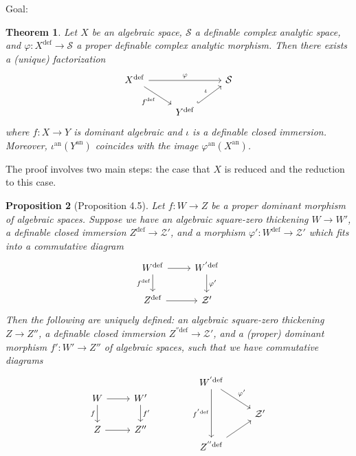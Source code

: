 \documentclass{amsart}
\newtheorem{theorem}{Theorem}[subsection]
\newtheorem{proposition}[theorem]{Proposition}
\theoremstyle{definition}
\numberwithin{equation}{section}
\newcommand{\definable}{\mathrm{def}}
\newcommand{\analytic}{\mathrm{an}}
\begin{document}
Goal:
\begin{theorem}
    Let $X$ be an algebraic space,
    $\mathcal{S}$ a definable complex analytic space,
    and $\varphi: X^{\definable} \to \mathcal{S}$ a proper definable complex analytic morphism.
    Then there exists a (unique) factorization
    \[\begin{tikzcd}
        X^{\definable}\ar[dr,"f^{\definable}"']\ar[rr,"\varphi"] & & \mathcal{S} \\
        & Y^{\definable} \ar[ur,"\iota",hook] & 
    \end{tikzcd}\]
    where $f: X \to Y$ is dominant algebraic and $\iota$ is a definable closed immersion.
    Moreover, $\iota^{\analytic}(Y^{\analytic})$ coincides with the image $\varphi^{\analytic}(X^{\analytic})$.
\end{theorem}

The proof involves two main steps:
the case that $X$ is reduced and the reduction to this case.

\begin{proposition}[Proposition 4.5]
    Let $f: W \to Z$ be a proper dominant morphism of algebraic spaces.
    Suppose we have an algebraic square-zero thickening
    $W \to W'$, a definable closed immersion $Z^{\definable} \to \mathcal{Z}'$,
    and a morphism $\varphi': W^{\definable}\to \mathcal{Z}'$ which fits into a commutative diagram
    \[\begin{tikzcd}
        W^{\definable} \ar[r]\ar[d,"f^{\definable}"'] & W^{'\definable}\ar[d,"\varphi'"] \\
        Z^{\definable} \ar[r] & \mathcal{Z}'
    \end{tikzcd}\]
    Then the following are uniquely defined:
    an algebraic square-zero thickening
    $Z \to Z''$,
    a definable closed immersion $Z^{''\definable} \to \mathcal{Z}'$,
    and a (proper) dominant morphism $f': W' \to Z''$ of algebraic spaces,
    such that we have commutative diagrams
    \[
    \begin{tikzcd}
        W\ar[r]\ar[d,"f"'] & W'\ar[d,"f'"] \\
        Z \ar[r] & Z''
    \end{tikzcd}
    \hspace{40pt}
    \begin{tikzcd}
        W^{'\definable}\ar[dd,"f^{'\definable}"']\ar[rd,"\varphi'"] & \\
        & \mathcal{Z}' \\
        Z^{''\definable}\ar[ur] &
    \end{tikzcd}
    \]
\end{proposition}
\end{document}

